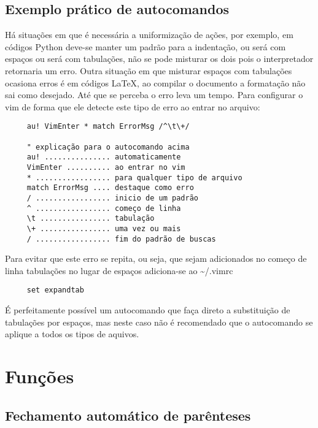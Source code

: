 \subsection{Exemplo prático de autocomandos}
\label{sub:Exemplo prático de autocomandos}

Há situações em que é necessária a uniformização de ações, por exemplo, em
códigos Python deve-se manter um padrão para a indentação, ou será com espaços
ou será com tabulações, não se pode misturar os dois pois o interpretador retornaria um erro.
Outra situação em que misturar espaços com tabulações ocasiona erros é em
códigos \LaTeX, ao compilar o documento a formatação não sai como desejado.
Até que se perceba o erro leva um tempo.  Para configurar o vim de forma que
ele detecte este tipo de erro ao entrar no arquivo:

\begin{verbatim}
     au! VimEnter * match ErrorMsg /^\t\+/

     " explicação para o autocomando acima
     au! ............... automaticamente
     VimEnter .......... ao entrar no vim
     * ................. para qualquer tipo de arquivo
     match ErrorMsg .... destaque como erro
     / ................. inicio de um padrão
     ^ ................. começo de linha
     \t ................ tabulação
     \+ ................ uma vez ou mais
     / ................. fim do padrão de buscas
\end{verbatim}

Para evitar que este erro se repita, ou seja, que sejam 
adicionados no começo de linha tabulações no lugar de espaços
adiciona-se ao \textasciitilde/.vimrc

\begin{verbatim}
     set expandtab
\end{verbatim}

É perfeitamente possível um autocomando que faça direto a substituição de
tabulações por espaços, mas neste caso não é recomendado que o autocomando se
aplique a todos os tipos de aquivos.

\section{Funções}
\label{sec:Funções}

\subsection{Fechamento automático de parênteses}
\label{sec:Fechamento automático de parênteses}

